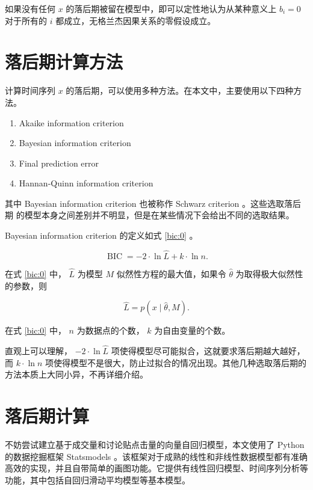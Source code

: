 如果没有任何 $x$ 的落后期被留在模型中，即可以定性地认为从某种意义上 $b_{i}=0$
对于所有的 ${i}$ 都成立，无格兰杰因果关系的零假设成立。

\section{落后期计算方法}

计算时间序列 $x$ 的落后期，可以使用多种方法。在本文中，主要使用以下四种方法。

\begin{enumerate}
  \item Akaike information criterion
  \item Bayesian information criterion
  \item Final prediction error
  \item Hannan-Quinn information criterion
\end{enumerate}

其中 Bayesian information criterion 也被称作 Schwarz criterion 。这些选取落后期
的模型本身之间差别并不明显，但是在某些情况下会给出不同的选取结果。

Bayesian information criterion 的定义如式 \ref{bic:0} 。

\begin{equation}
  \label{bic:0}
  \operatorname{BIC}=-2\cdot \ln \hat{L}+k\cdot \ln n.
\end{equation}

在式 \ref{bic:0} 中， $\hat{L}$ 为模型 $M$ 似然性方程的最大值，如果令 $\hat{\theta}$ 为取得极大似然性的参数，则

\begin{equation}
  \label{bic:1}
  \hat{L}=p(x\mid \hat{\theta},M).
\end{equation}

在式 \ref{bic:0} 中， $n$ 为数据点的个数， $k$ 为自由变量的个数。

直观上可以理解， $-2\cdot \ln \hat{L}$ 项使得模型尽可能拟合，这就要求落后期越大越好，而 $k\cdot \ln n$ 项使得模型不是很大，防止过拟合的情况出现。其他几种选取落后期的方法本质上大同小异，不再详细介绍。

\section{落后期计算}

不妨尝试建立基于成交量和讨论贴点击量的向量自回归模型，本文使用了 Python 的数据挖掘框架 Statsmodels\cite{statsmodels} 。该框架对于成熟的线性和非线性数据模型都有准确高效的实现，并且自带简单的画图功能。它提供有线性回归模型、时间序列分析等功能，其中包括自回归滑动平均模型等基本模型。

